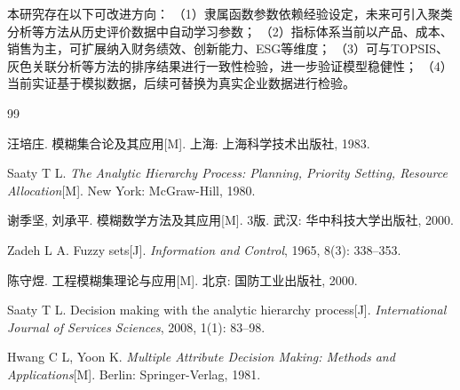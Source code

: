 \documentclass[a4paper,12pt]{ctexart}
\begin{document}
本研究存在以下可改进方向：
（1）隶属函数参数依赖经验设定，未来可引入聚类分析等方法从历史评价数据中自动学习参数；
（2）指标体系当前以产品、成本、销售为主，可扩展纳入财务绩效、创新能力、ESG等维度；
（3）可与TOPSIS、灰色关联分析等方法的排序结果进行一致性检验，进一步验证模型稳健性；
（4）当前实证基于模拟数据，后续可替换为真实企业数据进行检验。

\begin{thebibliography}{99}

汪培庄. 模糊集合论及其应用[M]. 上海: 上海科学技术出版社, 1983.

Saaty T L. \textit{The Analytic Hierarchy Process: Planning, Priority Setting,
Resource Allocation}[M]. New York: McGraw-Hill, 1980.

谢季坚, 刘承平. 模糊数学方法及其应用[M]. 3版. 武汉: 华中科技大学出版社, 2000.

Zadeh L A. Fuzzy sets[J]. \textit{Information and Control}, 1965, 8(3): 338--353.

陈守煜. 工程模糊集理论与应用[M]. 北京: 国防工业出版社, 2000.

Saaty T L. Decision making with the analytic hierarchy process[J].
\textit{International Journal of Services Sciences}, 2008, 1(1): 83--98.

Hwang C L, Yoon K. \textit{Multiple Attribute Decision Making: Methods and
Applications}[M]. Berlin: Springer-Verlag, 1981.

\end{thebibliography}
\end{document}
